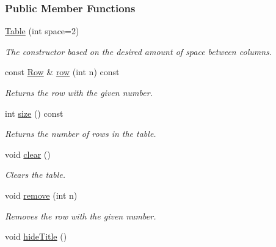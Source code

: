 \subsubsection*{Public Member Functions}
\begin{DoxyCompactItemize}
\item 
\hyperlink{structslb_1_1core_1_1util_1_1Table_acef4328bed93f6275da61e60615875f4}{Table} (int space=2)\hypertarget{structslb_1_1core_1_1util_1_1Table_acef4328bed93f6275da61e60615875f4}{}\label{structslb_1_1core_1_1util_1_1Table_acef4328bed93f6275da61e60615875f4}

\begin{DoxyCompactList}\small\item\em The constructor based on the desired amount of space between columns. \end{DoxyCompactList}\item 
const \hyperlink{structslb_1_1core_1_1util_1_1Row}{Row} \& \hyperlink{structslb_1_1core_1_1util_1_1Table_a5e64a6f9fe48cacf1fd394d83b617c63}{row} (int n) const 
\begin{DoxyCompactList}\small\item\em Returns the row with the given number. \end{DoxyCompactList}\item 
int \hyperlink{structslb_1_1core_1_1util_1_1Table_aa1e62d784e08afda693fea29232d33df}{size} () const 
\begin{DoxyCompactList}\small\item\em Returns the number of rows in the table. \end{DoxyCompactList}\item 
void \hyperlink{structslb_1_1core_1_1util_1_1Table_a86f0d79e7acebf7e803168cdb30c761a}{clear} ()\hypertarget{structslb_1_1core_1_1util_1_1Table_a86f0d79e7acebf7e803168cdb30c761a}{}\label{structslb_1_1core_1_1util_1_1Table_a86f0d79e7acebf7e803168cdb30c761a}

\begin{DoxyCompactList}\small\item\em Clears the table. \end{DoxyCompactList}\item 
void \hyperlink{structslb_1_1core_1_1util_1_1Table_a2f662576640d4efde9c396fbeaabd16e}{remove} (int n)
\begin{DoxyCompactList}\small\item\em Removes the row with the given number. \end{DoxyCompactList}\item 
void \hyperlink{structslb_1_1core_1_1util_1_1Table_a1956a2f2cc9a324e6ef252a655f26dad}{hide\+Title} ()\hypertarget{structslb_1_1core_1_1util_1_1Table_a1956a2f2cc9a324e6ef252a655f26dad}{}\label{structslb_1_1core_1_1util_1_1Table_a1956a2f2cc9a324e6ef252a655f26dad}


\end{DoxyCompactItemize}
